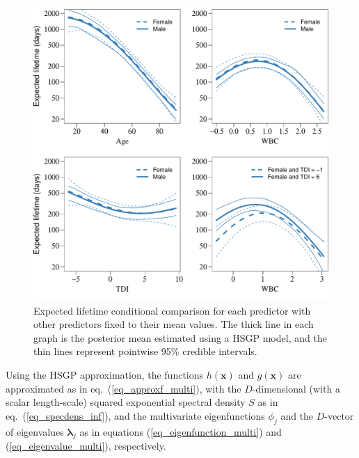 %
\begin{figure}
\centering
\includegraphics[scale=0.70, trim = 0mm 5mm 0mm 0mm, clip]{fig15_posteriors_leukemia.pdf}
\caption{Expected lifetime conditional comparison for each predictor with other predictors fixed to their mean values. The thick line in each graph is the posterior mean estimated using a HSGP model, and the thin lines represent pointwise 95\% credible intervals.}
  \label{fig15_posteriors_leukemia}
\end{figure}

Using the HSGP approximation, the functions $h(\bm{x})$ and $g(\bm{x})$ are approximated as in eq.~(\ref{eq_approxf_multi}), with the $D$-dimensional (with a scalar length-scale) squared exponential spectral density $S$ as in eq.~(\ref{eq_specdens_inf}), and the multivariate eigenfunctions $\phi_j$ and the $D$-vector of eigenvalues $\bm{\lambda}_j$ as in equations (\ref{eq_eigenfunction_multi}) and  (\ref{eq_eigenvalue_multi}), respectively.

